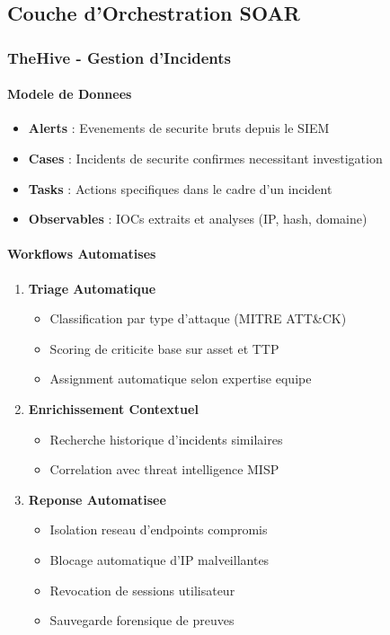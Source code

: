 \subsection{Couche d'Orchestration SOAR}

\subsubsection{TheHive - Gestion d'Incidents}

\paragraph{Modele de Donnees}
\begin{itemize}
    \item \textbf{Alerts} : Evenements de securite bruts depuis le SIEM
    \item \textbf{Cases} : Incidents de securite confirmes necessitant investigation
    \item \textbf{Tasks} : Actions specifiques dans le cadre d'un incident
    \item \textbf{Observables} : IOCs extraits et analyses (IP, hash, domaine)
\end{itemize}

\paragraph{Workflows Automatises}
\begin{enumerate}
    \item \textbf{Triage Automatique}
          \begin{itemize}
              \item Classification par type d'attaque (MITRE ATT\&CK)
              \item Scoring de criticite base sur asset et TTP
              \item Assignment automatique selon expertise equipe
          \end{itemize}

    \item \textbf{Enrichissement Contextuel}
          \begin{itemize}
              \item Recherche historique d'incidents similaires
              \item Correlation avec threat intelligence MISP
          \end{itemize}

    \item \textbf{Reponse Automatisee}
          \begin{itemize}
              \item Isolation reseau d'endpoints compromis
              \item Blocage automatique d'IP malveillantes
              \item Revocation de sessions utilisateur
              \item Sauvegarde forensique de preuves
          \end{itemize}
\end{enumerate}

